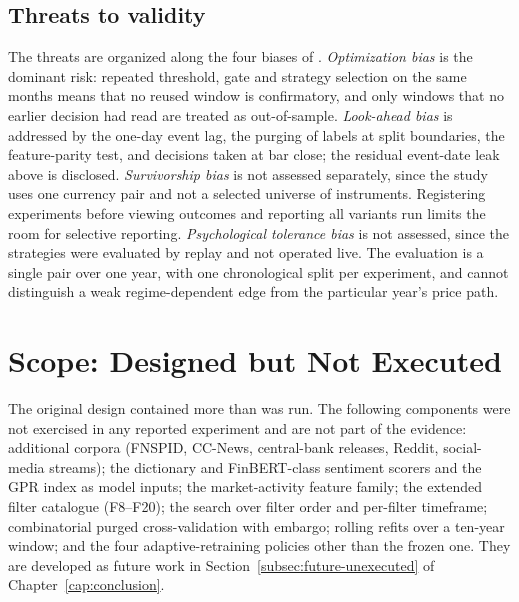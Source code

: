 \subsection{Threats to validity} \label{subsec:threats-summary}

The threats are organized along the four biases of . \emph{Optimization bias} is the dominant risk: repeated threshold, gate and strategy selection on the same months means that no reused window is confirmatory, and only windows that no earlier decision had read are treated as out-of-sample. \emph{Look-ahead bias} is addressed by the one-day event lag, the purging of labels at split boundaries, the feature-parity test, and decisions taken at bar close; the residual event-date leak above is disclosed. \emph{Survivorship bias} is not assessed separately, since the study uses one currency pair and not a selected universe of instruments. Registering experiments before viewing outcomes and reporting all variants run limits the room for selective reporting. \emph{Psychological tolerance bias} is not assessed, since the strategies were evaluated by replay and not operated live. The evaluation is a single pair over one year, with one chronological split per experiment, and cannot distinguish a weak regime-dependent edge from the particular year's price path.

\section{Scope: Designed but Not Executed} \label{sec:methodology-scope}

The original design contained more than was run. The following components were not exercised in any reported experiment and are not part of the evidence: additional corpora (FNSPID, CC-News, central-bank releases, Reddit, social-media streams); the dictionary and FinBERT-class sentiment scorers and the GPR index as model inputs; the market-activity feature family; the extended filter catalogue (F8--F20); the search over filter order and per-filter timeframe; combinatorial purged cross-validation with embargo; rolling refits over a ten-year window; and the four adaptive-retraining policies other than the frozen one. They are developed as future work in Section~\ref{subsec:future-unexecuted} of Chapter~\ref{cap:conclusion}.
